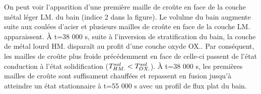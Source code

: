 On peut voir l'apparition d'une première maille de croûte en face de la couche métal léger LM. du bain (indice 2 dans la figure). Le volulme du bain augmente suite aux coulées d'acier et plusieurs mailles de croûte en face de la couche LM. apparaissent. À t=38 000 s, suite à l'inversion de stratification du bain, la couche de métal lourd HM. disparaît au profit d'une couche oxyde OX.. Par conséquent, les mailles de croûte plus froide précédemment en face de celle-ci passent de l'état conduction à l'état solidification ($\temperature[sol]{HM.} < \temperature[sol]{OX.}$). À t=38 000 s, les premières mailles de croûte sont suffisament chauffées et repassent en fusion jusqu'à atteindre un état stationnaire à t=55 000 s avec un profil de flux plat du bain.


